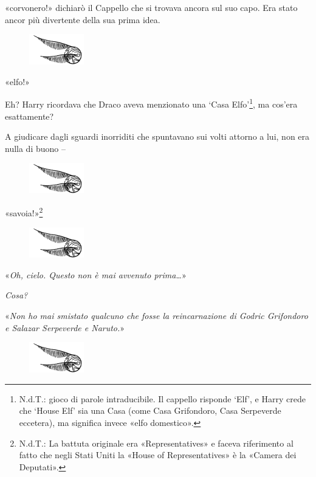 «corvonero!» dichiarò il Cappello che si trovava ancora sul suo capo. Era stato ancor più divertente della sua prima idea.

\begin{figure}[h]
	\includegraphics[scale=0.4]{boccino.png}
	\centering
\end{figure}

«elfo!»

Eh? Harry ricordava che Draco aveva menzionato una ‘Casa Elfo’\footnote{N.d.T.: gioco di parole intraducibile. Il cappello risponde ‘Elf’, e Harry crede che ‘House Elf’ sia una Casa (come Casa Grifondoro, Casa Serpeverde eccetera), ma significa invece «elfo domestico».}, ma cos’era esattamente?

A giudicare dagli sguardi inorriditi che spuntavano sui volti attorno a lui, non era nulla di buono –

\begin{figure}[h!]
	\includegraphics[scale=0.4]{boccino.png}
	\centering
\end{figure}

«savoia!»\footnote{N.d.T.: La battuta originale era «Representatives» e faceva riferimento al fatto che negli Stati Uniti la «House of Representatives» è la «Camera dei Deputati».}

\begin{figure}[h!]
	\includegraphics[scale=0.4]{boccino.png}
	\centering
\end{figure}

«\textit{Oh, cielo. Questo non è mai avvenuto prima…}»

\textit{Cosa?}

«\textit{Non ho mai smistato qualcuno che fosse la reincarnazione di Godric Grifondoro e Salazar Serpeverde e Naruto.}»

\begin{figure}[h!]
	\includegraphics[scale=0.4]{boccino.png}
	\centering
\end{figure}

